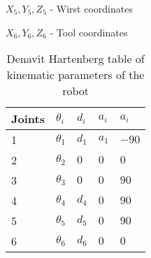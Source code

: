 \begin{math} X_5, Y_5, Z_5 \end{math} - Wirst coordinates

\begin{math} X_6, Y_6, Z_6 \end{math} - Tool coordinates

\begin{table}[H]
	\caption{Denavit Hartenberg table of kinematic parameters of the robot}\label{tab:DH}
	\centering
	\setlength{\tabcolsep}{18pt}
	\begin{tabular}{lllll}
	\hline 
	Joints & $\theta_i$ & $d_i$ & $a_i$ & $a_i$ \\ \hline
	1      & $\theta_1$ & $d_1$ & $a_1$ & $-90 $ \\
	2      & $\theta_2$ & $0  $ & $0  $ & $0   $ \\
	3      & $\theta_3$ & $0  $ & $0  $ & $90  $ \\
	4      & $\theta_4$ & $d_4$ & $0  $ & $90  $ \\
	5      & $\theta_5$ & $d_5$ & $0  $ & $90  $ \\
	6      & $\theta_6$ & $d_6$ & $0  $ & $0   $ \\ \hline
	\end{tabular}

	\end{table}

